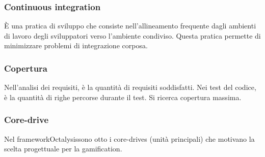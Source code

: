 \subsubsection*{Continuous integration}
 È una pratica di sviluppo che consiste nell'allineamento frequente dagli ambienti di lavoro degli sviluppatori verso l’ambiente condiviso. Questa pratica permette di minimizzare problemi di integrazione corposa.

\subsubsection*{Copertura}
Nell'analisi dei requisiti, è la quantità di requisiti soddisfatti. Nei test del codice, è la quantità di righe percorse durante il test. Si ricerca copertura massima.

\subsubsection*{Core-drive}
Nel framework\glosp Octalysis\glosp sono otto i core-drives (unità principali) che motivano la scelta progettuale per la gamification\glo.

